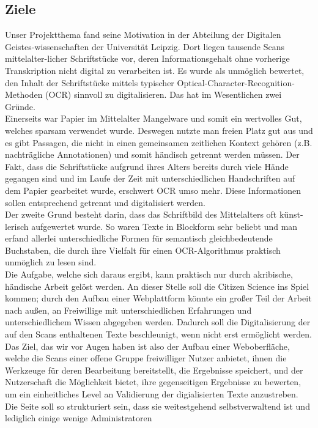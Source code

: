 \documentclass{article}
\begin{document}
\subsection{Ziele}
Unser Projektthema fand seine Motivation in der Abteilung der Digitalen Geistes-wissenschaften der Universität Leipzig.
Dort liegen tausende Scans mittelalter-licher Schriftstücke vor, deren Informationsgehalt ohne vorherige Transkription nicht digital zu verarbeiten ist.
Es wurde als unmöglich bewertet, den Inhalt der Schriftstücke mittels typischer Optical-Character-Recognition-Methoden (OCR) sinnvoll zu digitalisieren.
Das hat im Wesentlichen zwei Gründe.\\
Einerseits war Papier im Mittelalter Mangelware und somit ein wertvolles Gut, welches sparsam verwendet wurde.
Deswegen nutzte man freien Platz gut aus und es gibt Passagen,
die nicht in einen gemeinsamen zeitlichen Kontext gehören (z.B. nachträgliche Annotationen) und somit händisch getrennt werden müssen.
Der Fakt, dass die Schriftstücke aufgrund ihres Alters bereits durch viele Hände gegangen sind und im Laufe der Zeit
mit unterschiedlichen Handschriften auf dem Papier gearbeitet wurde, erschwert OCR umso mehr.
Diese Informationen sollen entsprechend getrennt und digitalisiert werden.\\
Der zweite Grund besteht darin, dass das Schriftbild des Mittelalters oft künst-lerisch aufgewertet wurde.
So waren Texte in Blockform sehr beliebt und man erfand allerlei unterschiedliche Formen für semantisch gleichbedeutende Buchstaben,
die durch ihre Vielfalt für einen OCR-Algorithmus praktisch unmöglich zu lesen sind.\\
Die Aufgabe, welche sich daraus ergibt, kann praktisch nur durch akribische, händische Arbeit gelöst werden.
An dieser Stelle soll die Citizen Science ins Spiel kommen; durch den Aufbau einer Webplattform könnte ein großer Teil der Arbeit nach außen,
an Freiwillige mit unterschiedlichen Erfahrungen und unterschiedlichem Wissen abgegeben werden.
Dadurch soll die Digitalisierung der auf den Scans enthaltenen Texte beschleunigt, wenn nicht erst ermöglicht werden.\\
Das Ziel, das wir vor Augen haben ist also der Aufbau einer Weboberfläche, welche die Scans einer offene Gruppe freiwilliger Nutzer anbietet,
ihnen die Werkzeuge für deren Bearbeitung bereitstellt, die Ergebnisse speichert, und der Nutzerschaft die Möglichkeit bietet,
ihre gegenseitigen Ergebnisse zu bewerten, um ein einheitliches Level an Validierung der digialisierten Texte anzustreben.
Die Seite soll so strukturiert sein, dass sie weitestgehend selbstverwaltend ist und lediglich einige wenige Administratoren
\end{document}
